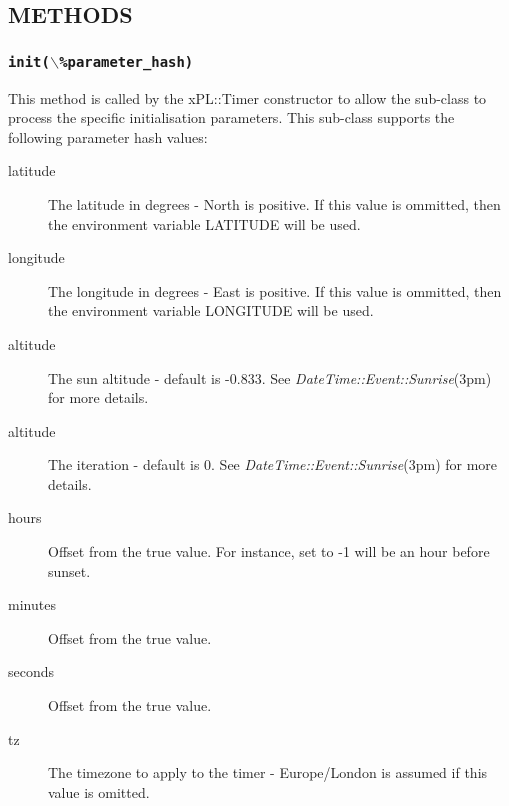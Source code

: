 \documentclass[12pt,a4paper]{article}
\begin{document}
\subsection*{METHODS\label{xPL::Timer::sunset_METHODS}}
\subsubsection*{\texttt{init($\backslash$\%parameter\_hash)}\label{xPL::Timer::sunset_init_backslash_parameter_hash_}}


This method is called by the xPL::Timer constructor to allow the
sub-class to process the specific initialisation parameters.  This
sub-class supports the following parameter hash values:

\begin{description}

\item[{latitude}] \mbox{}

The latitude in degrees - North is positive.  If this value is
ommitted, then the environment variable LATITUDE will be used.


\item[{longitude}] \mbox{}

The longitude in degrees - East is positive.  If this value is
ommitted, then the environment variable LONGITUDE will be used.


\item[{altitude}] \mbox{}

The sun altitude - default is -0.833.  See \emph{DateTime::Event::Sunrise}(3pm)
for more details.


\item[{altitude}] \mbox{}

The iteration - default is 0.  See \emph{DateTime::Event::Sunrise}(3pm)
for more details.


\item[{hours}] \mbox{}

Offset from the true value.  For instance, set to -1 will be an hour
before sunset.


\item[{minutes}] \mbox{}

Offset from the true value.


\item[{seconds}] \mbox{}

Offset from the true value.


\item[{tz}] \mbox{}

The timezone to apply to the timer - Europe/London is assumed if this
value is omitted.

\end{description}
\end{document}
